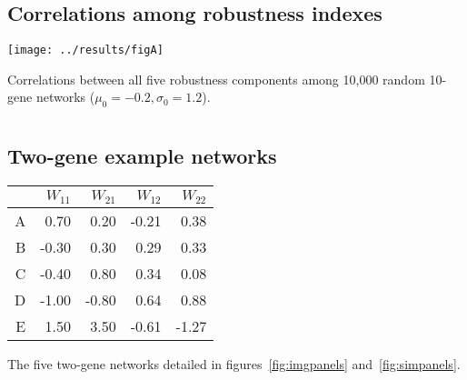 \documentclass[10pt,a4paper]{article}
\begin{document}
\begin{appendices}
  \setcounter{section}{0}
  \renewcommand{\thesection}{\arabic{section}}

  \clearpage
  \section{}
    \label{supp:fullcorr}
    \subsection*{Correlations among robustness indexes}
	\begin{adjustwidth}{-1in}{0in}
	\begin{flushright}
	\texttt{[image: ../results/figA]}
	\end{flushright}

	\color{Gray} Correlations between all five robustness components among 10,000 random 10-gene networks ($\mu_0=-0.2, \sigma_0=1.2$). 
	\end{adjustwidth}


  \clearpage
  \section{}
    \label{supp:W}
    \subsection*{Two-gene example networks}

	\begin{center}
	\begin{tabular}{rrrrr}
	  \hline
	 & $W_{11}$ & $W_{21}$ & $W_{12}$ & $W_{22}$ \\ 
	  \hline
	  A & 0.70 & 0.20 & -0.21 & 0.38 \\ 
	  B & -0.30 & 0.30 & 0.29 & 0.33 \\ 
	  C & -0.40 & 0.80 & 0.34 & 0.08 \\ 
	  D & -1.00 & -0.80 & 0.64 & 0.88 \\ 
	  E & 1.50 & 3.50 & -0.61 & -1.27 \\ 
	   \hline
	\end{tabular}
	\end{center}
	
	{\color{Gray} The five two-gene networks detailed in figures~\ref{fig:imgpanels} and~\ref{fig:simpanels}.}

  \clearpage
  \section{}
    \label{supp:whyitfails}

\end{appendices}
\end{document}
